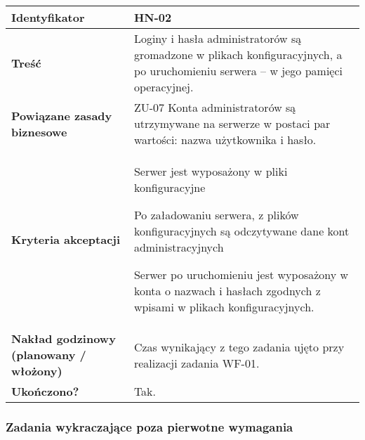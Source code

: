   \begin{tabular}{ | l | l | }
  	\hline
  		\textbf{Identyfikator} &
  		HN-02
  		\\

  	\hline
  		\textbf{Treść} & \parbox[t]{11.5cm}{\strut
  			Loginy i hasła administratorów są gromadzone w plikach
        konfiguracyjnych, a po uruchomieniu serwera -- w jego
        pamięci operacyjnej.
  		\strut}\\

  	\hline
  		\parbox[t]{4cm}{\textbf{Powiązane zasady biznesowe}} & \parbox[t]{11.5cm}{\strut
  			ZU-07 Konta administratorów są utrzymywane na serwerze w postaci par wartości: nazwa użytkownika i hasło.
  		\strut}\\

  	\hline
  		\parbox[t]{4cm}{\textbf{Kryteria akceptacji}} & \parbox[t]{11.5cm}{\strut
  			\begin{enumreq}
  				\item Serwer jest wyposażony w pliki konfiguracyjne
          \item Po załadowaniu serwera, z plików konfiguracyjnych
          są odczytywane dane kont administracyjnych
          \item Serwer po uruchomieniu jest wyposażony w konta o
          nazwach i hasłach zgodnych z wpisami w plikach konfiguracyjnych.
  			\end{enumreq}
  			\strut}
  		\\

  	\hline
    \parbox[t]{4cm}{\textbf{Nakład godzinowy (planowany / włożony)}} & \parbox[t]{11.5cm}{\strut
      Czas wynikający z tego zadania ujęto przy realizacji zadania WF-01.
    \strut}\\
\hline

  \hline
    \parbox[t]{4cm}{\textbf{Ukończono?}} &
    \parbox[t]{11.5cm}{\strut
      Tak.
    \strut}\\

    \hline
  \end{tabular}

\subsubsection{Zadania wykraczające poza pierwotne wymagania}

\leavevmode\hbox{}

